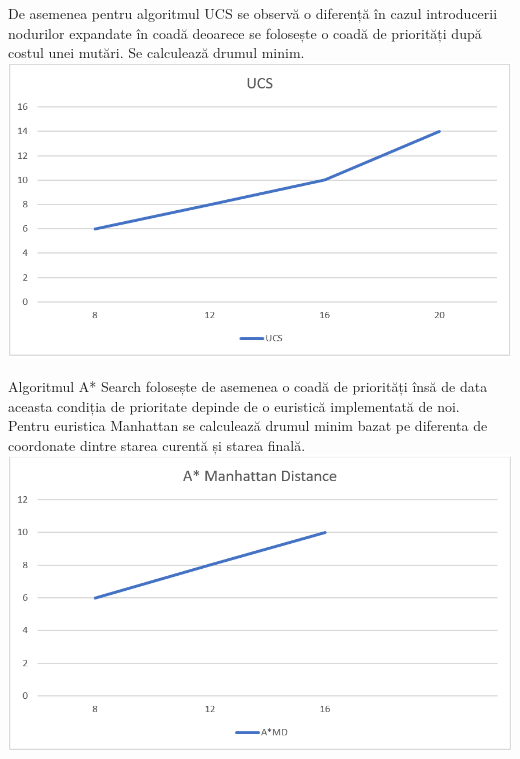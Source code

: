 \documentclass[a4paper,12pt]{report}
\begin{document}
 De asemenea pentru algoritmul UCS se observă o diferență în cazul introducerii nodurilor expandate în coadă deoarece se folosește o coadă de priorități după costul unei mutări. Se calculează drumul minim.\\
 \includegraphics{fig/UCS.PNG}
 
 Algoritmul A* Search folosește de asemenea o coadă de priorități însă de data aceasta condiția de prioritate depinde de o euristică implementată de noi.\\
 Pentru euristica Manhattan se calculează drumul minim bazat pe diferenta de coordonate dintre starea curentă și starea finală.\\
 \includegraphics{fig/ASSMD.PNG}
 
\end{document}
